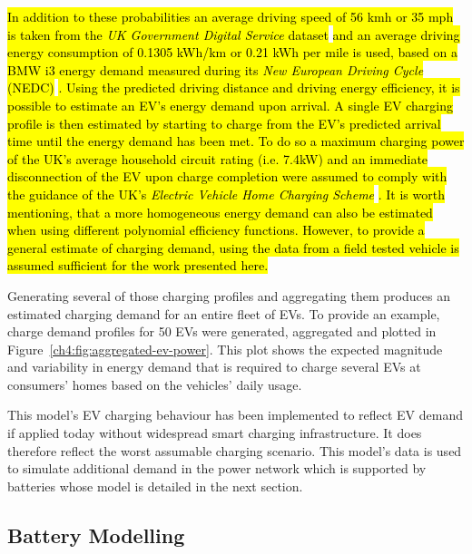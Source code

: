 


 
\hl{In addition to these probabilities an average driving speed of 56 kmh  or 35 mph is taken from the \textit{UK Government Digital Service} dataset }\cite{UKGovernmentDigitalService2013}\hl{ and an average driving energy consumption of 0.1305 kWh/km or 0.21 kWh per mile is used, based on a BMW i3 energy demand measured during its \textit{New European Driving Cycle} (NEDC) }\cite{BMW_press_i3}\hl{.
Using the predicted driving distance and driving energy efficiency, it is possible to estimate an EV's energy demand upon arrival.
A single EV charging profile is then estimated by starting to charge from the EV's predicted arrival time until the energy demand has been met.
To do so a maximum charging power of the UK's average household circuit rating (i.e. 7.4kW) and an immediate disconnection of the EV upon charge completion were assumed to comply with the guidance of the UK's \textit{Electric Vehicle Home Charging Scheme} }\cite{EVHomeCharging}\hl{.
It is worth mentioning, that a more homogeneous energy demand can also be estimated when using different polynomial efficiency functions.
However, to provide a general estimate of charging demand, using the data from a field tested vehicle is assumed sufficient for the work presented here.}



Generating several of those charging profiles and aggregating them produces an estimated charging demand for an entire fleet of EVs.
To provide an example, charge demand profiles for 50 EVs were generated, aggregated and plotted in Figure~\ref{ch4:fig:aggregated-ev-power}.
This plot shows the expected magnitude and variability in energy demand that is required to charge several EVs at consumers' homes based on the vehicles' daily usage.

This model's EV charging behaviour has been implemented to reflect EV demand if applied today without widespread smart charging infrastructure.
It does therefore reflect the worst assumable charging scenario.
This model's data is used to simulate additional demand in the power network which is supported by batteries whose model is detailed in the next section.

\subsection{Battery Modelling}

